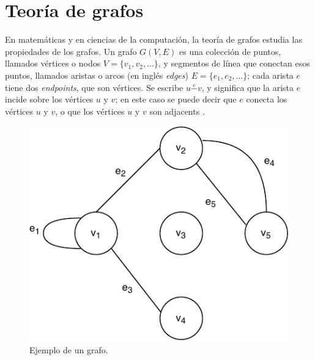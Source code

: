 




\section{Teoría de grafos}\label{graph theory}
En matemáticas y en ciencias de la computación, la teoría de grafos estudia las propiedades de los grafos. Un grafo \( G(V,E) \) es una colección de puntos, llamados vértices o nodos \( V = \{ v_1, v_2, \dots \} \), y segmentos de línea que conectan esos puntos, llamados aristas o arcos (en inglés \textit{edges}) \( E = \{ e_1, e_2, \dots \} \); cada arista \( e \) tiene dos \textit{\gls{endpoints}}, que son vértices. Se escribe \( u \overset{e}{-} v \), y significa que la arista \( e \) incide sobre los vértices \( u \) y \( v \); en este caso se puede decir que \( e \) conecta los vértices \( u \) y \( v \), o que los vértices \( u \) y \( v \) son \gls{adjacents} \cite{even2011graph}.

\begin{figure}[H]
	\centering
	\includegraphics[width=0.35\linewidth]{document/GraphTheory/images/example-of-a-graph}
	\caption{Ejemplo de un grafo. \cite{even2011graph}}
	\label{fig:example-of-a-graph}
\end{figure}

